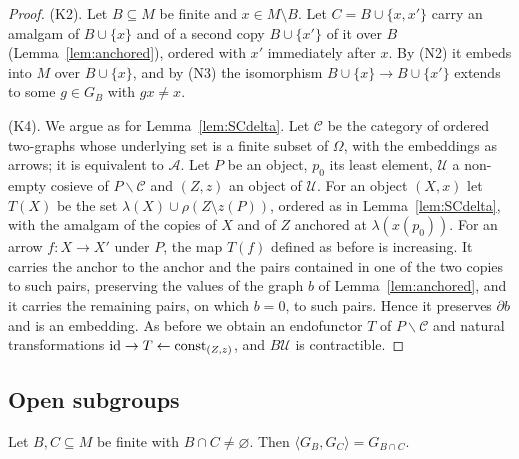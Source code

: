 \begin{proof}
(K2). Let $B\subseteq M$ be finite and $x\in M\setminus B$. Let
$C=B\cup\{x,x'\}$ carry an amalgam of $B\cup\{x\}$ and of a second copy
$B\cup\{x'\}$ of it over $B$ (Lemma~\ref{lem:anchored}), ordered with $x'$
immediately after $x$. By (N2) it embeds into $M$ over $B\cup\{x\}$, and by
(N3) the isomorphism $B\cup\{x\}\to B\cup\{x'\}$ extends to some $g\in G_B$
with $gx\ne x$.

(K4). We argue as for Lemma~\ref{lem:SCdelta}. Let $\mathcal C$ be the
category of ordered two-graphs whose underlying set is a finite subset of
$\Omega$, with the embeddings as arrows; it is equivalent to $\mathcal A$. Let
$P$ be an object, $p_0$ its least element, $\mathcal U$ a non-empty cosieve of
$P\backslash\mathcal C$ and $(Z,z)$ an object of $\mathcal U$. For an object
$(X,x)$ let $T(X)$ be the set $\lambda(X)\cup\rho(Z\setminus z(P))$, ordered
as in Lemma~\ref{lem:SCdelta}, with the amalgam of the copies of $X$ and of
$Z$ anchored at $\lambda(x(p_0))$. For an arrow $f\colon X\to X'$ under $P$,
the map $T(f)$ defined as before is increasing. It carries the anchor to the
anchor and the pairs contained in one of the two copies to such pairs,
preserving the values of the graph $b$ of Lemma~\ref{lem:anchored}, and it
carries the remaining pairs, on which $b=0$, to such pairs. Hence it
preserves $\partial b$ and is an embedding. As before we obtain an
endofunctor $T$ of $P\backslash\mathcal C$ and natural transformations
$\mathrm{id}\to T\leftarrow\mathrm{const}_{(Z,z)}$, and $B\mathcal U$ is contractible.
\end{proof}

\subsection{Open subgroups}

\begin{lemma}\label{lem:stab2a}
Let $B,C\subseteq M$ be finite with $B\cap C\ne\varnothing$. Then
$\langle G_B,G_C\rangle=G_{B\cap C}$.
\end{lemma}

